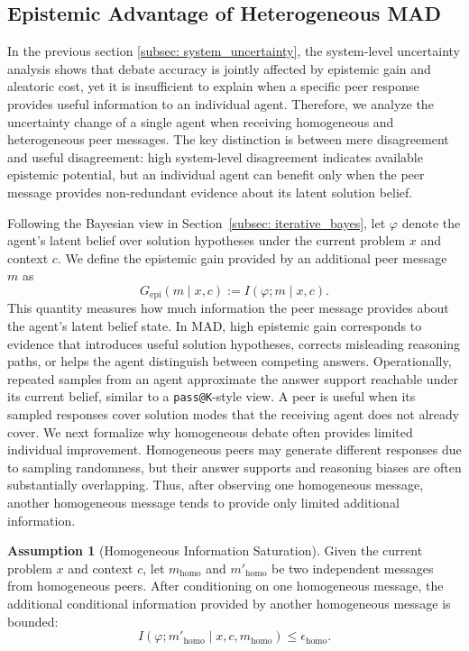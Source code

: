 \documentclass{article}
\theoremstyle{plain}
\theoremstyle{definition}
\newtheorem{assumption}[theorem]{Assumption}
\theoremstyle{remark}
\begin{document}
\subsection{Epistemic Advantage of Heterogeneous MAD}\label{subsec:agent_uncertainty}
In the previous section \ref{subsec: system_uncertainty}, the system-level uncertainty analysis shows that debate accuracy is jointly affected by epistemic gain and aleatoric cost, yet it is insufficient to explain when a specific peer response provides useful information to an individual agent. Therefore, we analyze the uncertainty change of a single agent when receiving homogeneous and heterogeneous peer messages. The key distinction is between mere disagreement and useful disagreement: high system-level disagreement indicates available epistemic potential, but an individual agent can benefit only when the peer message provides non-redundant evidence about its latent solution belief.


Following the Bayesian view in Section~\ref{subsec: iterative_bayes}, let $\varphi$ denote the agent's latent belief over solution hypotheses under the current problem $x$ and context $c$. We define the epistemic gain provided by an additional peer message $m$ as
\[
G_{\mathrm{epi}}(m \mid x,c) := I(\varphi; m \mid x,c).
\]
This quantity measures how much information the peer message provides about the agent's latent belief state. In MAD, high epistemic gain corresponds to evidence that introduces useful solution hypotheses, corrects misleading reasoning paths, or helps the agent distinguish between competing answers. Operationally, repeated samples from an agent approximate the answer support reachable under its current belief, similar to a \texttt{pass@K}-style view. A peer is useful when its sampled responses cover solution modes that the receiving agent does not already cover.
We next formalize why homogeneous debate often provides limited individual improvement. Homogeneous peers may generate different responses due to sampling randomness, but their answer supports and reasoning biases are often substantially overlapping. Thus, after observing one homogeneous message, another homogeneous message tends to provide only limited additional information.
\begin{assumption}[Homogeneous Information Saturation]\label{ass:homo_saturation}
Given the current problem $x$ and context $c$, let $m_{\mathrm{homo}}$ and $m'_{\mathrm{homo}}$ be two independent messages from homogeneous peers. After conditioning on one homogeneous message, the additional conditional information provided by another homogeneous message is bounded:
\[
I(\varphi; m'_{\mathrm{homo}} \mid x,c,m_{\mathrm{homo}})
\le
\epsilon_{\mathrm{homo}}.
\]
\end{assumption}
\end{document}
